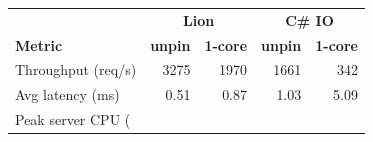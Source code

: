 \begin{tabular}{@{}lrrrr@{}}
\toprule
 & \multicolumn{2}{c}{\textbf{Lion}} & \multicolumn{2}{c}{\textbf{C\# IO}} \\
\textbf{Metric} & \textbf{unpin} & \textbf{1-core} & \textbf{unpin} & \textbf{1-core} \\
\midrule
Throughput (req/s) & 3275 & 1970 & 1661 & 342 \\
Avg latency (ms) & 0.51 & 0.87 & 1.03 & 5.09 \\
Peak server CPU (%
\bottomrule
\end{tabular}
